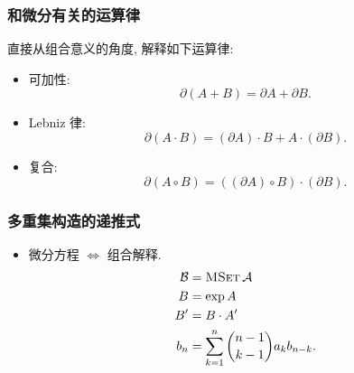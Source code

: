 \documentclass{ctexbeamer}
\newcommand{\bbF}{\mathbb F}
\DeclareMathOperator{\MSet}{\textsc{MSet}}
\begin{document}
\begin{frame}
  \frametitle{和微分有关的运算律}

  直接从组合意义的角度, 解释如下运算律:
  \begin{itemize}
    \item 可加性:
    \begin{equation}
      \partial (A + B) = \partial A + \partial B.
    \end{equation}
    \item Lebniz 律:
    \begin{equation}
      \partial (A \cdot B) = (\partial A) \cdot B + A \cdot (\partial B).
    \end{equation}
    \item 复合:
    \begin{equation}
      \partial (A \circ B) = ((\partial A) \circ B) \cdot (\partial B).
    \end{equation}
  \end{itemize}

\end{frame}

\begin{frame}
  \frametitle{多重集构造的递推式}

  \begin{itemize}
    \item 微分方程 $\iff$ 组合解释.
    \begin{align}
      \mathcal B &= \MSet \mathcal A\\
      B &= \exp A\\
      B' &= B \cdot A'\\
      b_n &= \sum_{k=1}^n \binom{n-1}{k-1} a_k b_{n-k}.
    \end{align}
  \end{itemize}

\end{frame}


\end{document}
